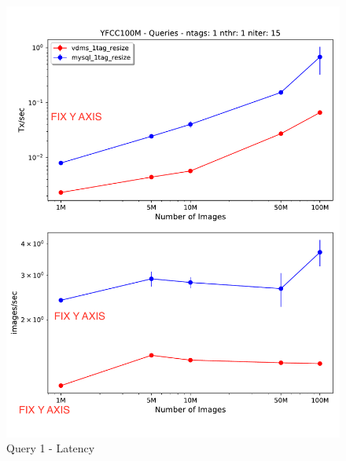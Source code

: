 \begin{figure}[]
\centering
\includegraphics[width=\columnwidth]{figures/q1_latency}
\caption{Query 1 - Latency}
\label{fig:q1_latency}
\end{figure}

